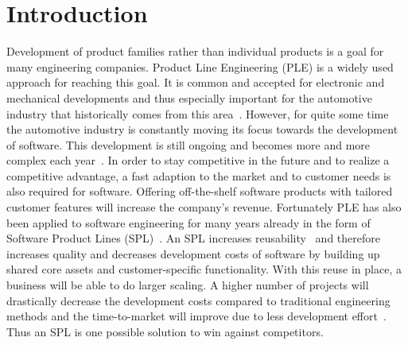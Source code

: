 \section{Introduction}\label{introduction}

Development of product families rather than individual products is a goal for
many engineering companies. Product Line Engineering (PLE) is a widely used
approach for reaching this goal. It is common and accepted for electronic and
mechanical developments and thus especially important for the automotive
industry that historically comes from this area~\cite{bookssp19X19}. However,
for quite some time the automotive industry is constantly moving its focus
towards the development of software. This development is still ongoing and
becomes more and more complex each year~\cite{ICSE03498}. In order to stay
competitive in the future and to realize a competitive advantage, a fast
adaption to the market and to customer needs is also required for software.
Offering off-the-shelf software products with tailored customer features will
increase the company's revenue. Fortunately PLE has also been applied to
software engineering for many years already in the form of Software Product
Lines (SPL)~\cite{confsplc2000}. An SPL increases reusability~\cite{Clem02a} and
therefore increases quality and decreases development costs of software by
building up shared core assets and customer-specific functionality. With this
reuse in place, a business will be able to do larger scaling. A higher number of
projects will drastically decrease the development costs compared to traditional
engineering methods and the time-to-market will improve due to less development
effort~\cite{confsplcAzanzaMD21}. Thus an SPL is one possible solution to win
against competitors.

